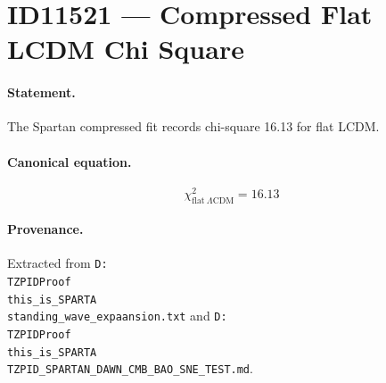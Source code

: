 \section*{ID11521 --- Compressed Flat LCDM Chi Square}

\paragraph{Statement.}
The Spartan compressed fit records chi-square 16.13 for flat LCDM.

\paragraph{Canonical equation.}
\[
\chi^2_{\mathrm{flat\ }\Lambda\mathrm{CDM}}=16.13
\]

\paragraph{Provenance.}
Extracted from \texttt{D:\\TZPIDProof\\this\_is\_SPARTA\\standing\_wave\_expaansion.txt} and \texttt{D:\\TZPIDProof\\this\_is\_SPARTA\\TZPID\_SPARTAN\_DAWN\_CMB\_BAO\_SNE\_TEST.md}.
